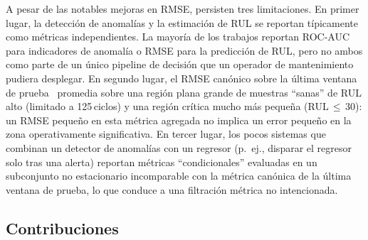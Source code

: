 \documentclass[5p,times,authoryear]{elsarticle}
\begin{document}
A pesar de las notables mejoras en RMSE, persisten tres limitaciones. En primer lugar, la detección de anomalías y la estimación de RUL se reportan típicamente como métricas independientes. La mayoría de los trabajos reportan ROC-AUC para indicadores de anomalía o RMSE para la predicción de RUL, pero no ambos como parte de un único pipeline de decisión que un operador de mantenimiento pudiera desplegar. En segundo lugar, el RMSE canónico sobre la última ventana de prueba~\citep{li2018remaining} promedia sobre una región plana grande de muestras ``sanas'' de RUL alto (limitado a 125\,ciclos) y una región crítica mucho más pequeña (RUL\,$\le$\,30): un RMSE pequeño en esta métrica agregada no implica un error pequeño en la zona operativamente significativa. En tercer lugar, los pocos sistemas que combinan un detector de anomalías con un regresor (p.~ej., disparar el regresor solo tras una alerta) reportan métricas ``condicionales'' evaluadas en un subconjunto no estacionario incomparable con la métrica canónica de la última ventana de prueba, lo que conduce a una filtración métrica no intencionada.

\subsection{Contribuciones}\label{sec:contribs}
\end{document}
